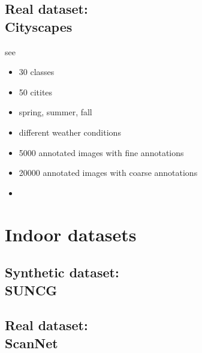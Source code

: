 \subsection{Real dataset:\\
	 Cityscapes}
see \cite{Cordts_2016_CVPR}

\begin{itemize}
	\item 30 classes
	\item 50 citites
	\item spring, summer, fall
	\item different weather conditions
	\item 5000 annotated images with fine annotations
	\item 20000 annotated images with coarse annotations
	\item 
\end{itemize}

\section{Indoor datasets}

\subsection{Synthetic dataset:\\
	 SUNCG}

\subsection{Real dataset:\\
	 ScanNet}